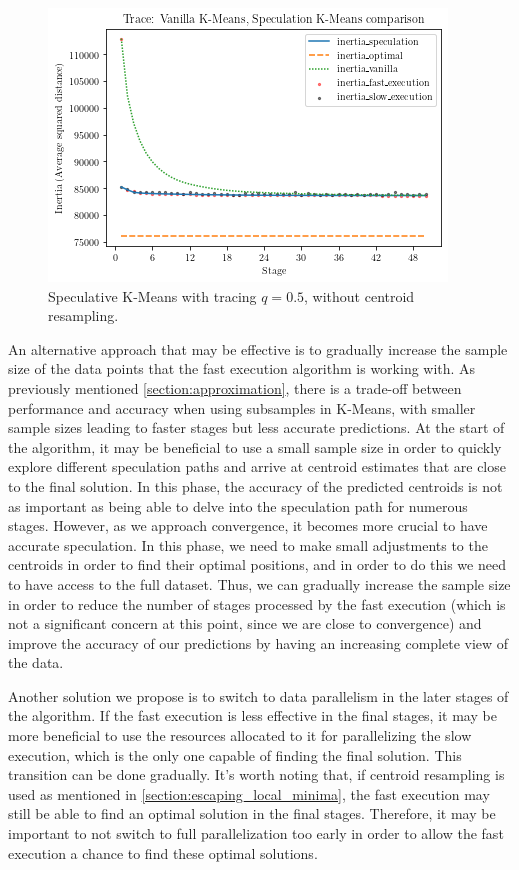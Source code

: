 \begin{figure}[h]
\centering
\includegraphics[width=\linewidth]{./plots/vanilla_speculation_comparison_trace.png}
\caption{Speculative K-Means with tracing $q = 0.5$, without centroid resampling.}
\label{fig:vanilla_speculation_comparison_trace}
\end{figure}

An alternative approach that may be effective is to gradually increase the sample size of the data points that the fast execution algorithm is working with. As previously mentioned \ref{section:approximation}, there is a trade-off between performance and accuracy when using subsamples in K-Means, with smaller sample sizes leading to faster stages but less accurate predictions. At the start of the algorithm, it may be beneficial to use a small sample size in order to quickly explore different speculation paths and arrive at centroid estimates that are close to the final solution. In this phase, the accuracy of the predicted centroids is not as important as being able to delve into the speculation path for numerous stages. However, as we approach convergence, it becomes more crucial to have accurate speculation. In this phase, we need to make small adjustments to the centroids in order to find their optimal positions, and in order to do this we need to have access to the full dataset. Thus, we can gradually increase the sample size in order to reduce the number of stages processed by the fast execution (which is not a significant concern at this point, since we are close to convergence) and improve the accuracy of our predictions by having an increasing complete view of the data.

Another solution we propose is to switch to data parallelism in the later stages of the algorithm. If the fast execution is less effective in the final stages, it may be more beneficial to use the resources allocated to it for parallelizing the slow execution, which is the only one capable of finding the final solution. This transition can be done gradually. It's worth noting that, if centroid resampling is used as mentioned in \ref{section:escaping_local_minima}, the fast execution may still be able to find an optimal solution in the final stages. Therefore, it may be important to not switch to full parallelization too early in order to allow the fast execution a chance to find these optimal solutions.
